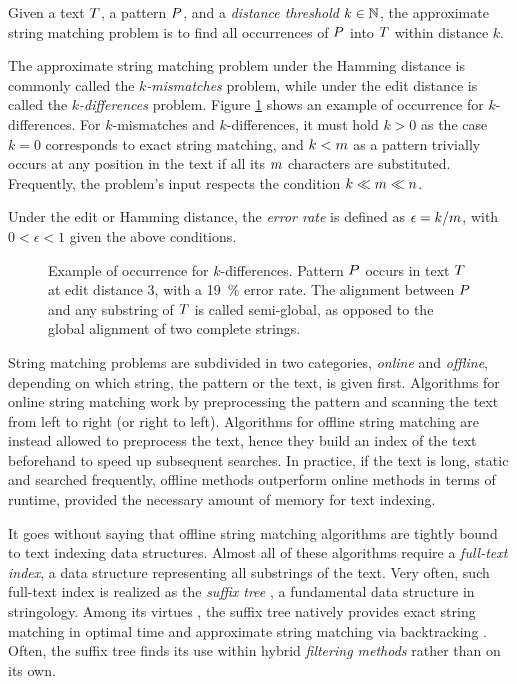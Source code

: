 \begin{definition}
\citep{Galil1988}
Given a text $T$, a pattern $P$, and a \emph{distance threshold} $k \in \mathbb {N}$, the approximate string matching problem is to find all occurrences of $P$ into $T$ within distance $k$.
\end{definition}
The approximate string matching problem under the Hamming distance is commonly called the \emph{$k$-mismatches} problem, while under the edit distance is called the \emph{$k$-differences} problem.
Figure \ref{fig:edit-occurrence} shows an example of occurrence for $k$-differences.
For $k$-mismatches and $k$-differences, it must hold $k > 0$ as the case $k = 0$ corresponds to exact string matching, and $k < m$ as a pattern trivially occurs at any position in the text if all its $m$ characters are substituted.
Frequently, the problem's input respects the condition $k \ll m \ll n$.
\begin{definition}
Under the edit or Hamming distance, the \emph{error rate} is defined as $\epsilon = k/m$, with $0 < \epsilon < 1$ given the above conditions.
\end{definition}

\begin{figure}[t]
\begin{center}
\caption[Example of occurrence for $k$-differences]{Example of occurrence for $k$-differences. Pattern $P$ occurs in text $T$ at edit distance 3, \ie with a 19~\% error rate.
The alignment between $P$ and any substring of $T$ is called semi-global, as opposed to the global alignment of two complete strings.
}
\label{fig:edit-occurrence}

\end{center}
\end{figure}

String matching problems are subdivided in two categories, \emph{online} and \emph{offline}, depending on which string, the pattern or the text, is given first.
Algorithms for online string matching work by preprocessing the pattern and scanning the text from left to right (or right to left).
Algorithms for offline string matching are instead allowed to preprocess the text,
hence they build an index of the text beforehand to speed up subsequent searches.
In practice, if the text is long, static and searched frequently, offline methods outperform online methods in terms of runtime, provided the necessary amount of memory for text indexing.

It goes without saying that offline string matching algorithms are tightly bound to text indexing data structures.
Almost all of these algorithms require a \emph{full-text index}, \ie a data structure representing all substrings of the text.
Very often, such full-text index is realized as the \emph{suffix tree} \citep{Weiner1973}, a fundamental data structure in stringology.
Among its virtues \citep{Apostolico1985}, the suffix tree natively provides exact string matching in optimal time and approximate string matching via backtracking \citep{Ukkonen1993}.
Often, the suffix tree finds its use within hybrid \emph{filtering methods} rather than on its own.

